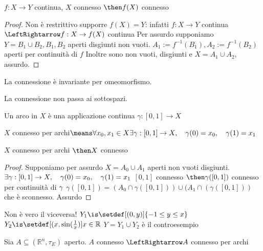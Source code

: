\begin{teo}
 $f:X \rightarrow Y$ continua, $X$ connesso $\then f(X)$ connesso 
\end{teo}
\begin{proof}
  Non è restrittivo supporre $f(X)=Y$: infatti $f:X \rightarrow Y$ continua $\LeftRightarrow f:X\rightarrow f(X)$ continua
 Per assurdo supponiamo $Y = B_1 \cup B_2, B_1,B_2$ aperti disgiunti non vuoti.
 $A_1:=f^{-1}(B_1), A_2:=f^{-1}(B_2)$ aperti per continuità di $f$
 Inoltre sono non vuoti, disgiunti e $X=A_1\cup A_2$, assurdo.
\end{proof}
\begin{cor}
 La connessione è invariante per omeomorfismo. 
\end{cor}
\begin{oss}
 La connessione non passa ai sottospazi.
\end{oss}
\begin{defn}[Arco]
 Un arco in $X$ è una applicazione continua $\gamma:[0,1]\rightarrow X$
\end{defn}
\begin{defn}
 $X$ connesso per archi$\means \forall x_0, x_1 \in X \exists \gamma :[0,1]\rightarrow X,\quad \gamma(0)=x_0,\quad \gamma(1)=x_1$
\end{defn}
\begin{prop}
 $X$ connesso per archi $\then X$ connesso
\end{prop}
\begin{proof}
 Supponiamo per assurdo $X=A_0\cup A_1$ aperti non vuoti disgiunti.
 $\exists \gamma :[0,1]\rightarrow X,\quad \gamma(0)=x_0,\quad \gamma(1)=x_1\\$
 $[0,1]$ connesso $\then \gamma([0,1])$ connesso per continuità di $\gamma\\$
 $\gamma([0,1])=(A_0\cap \gamma([0,1])) \cup (A_1\cap(\gamma([0,1]))$ che è sconnesso. Assurdo
\end{proof}
\begin{es}
 Non è vero il viceversa!
 $Y_1\is\setdef[(0,y)]{-1\le y \le x}\\$
 $Y_2\is\setdef[(x,\sin (\frac{1}{x})]{x\in \mathbb R}\\$
 $Y=Y_1\cup Y_2$ è il controesempio 
\end{es}
\begin{prop}
 Sia $A\subseteq (\mathbb R^n, \tau _E)$ aperto.
 $A$ connesso $\LeftRightarrow A$ connesso per archi
\end{prop}
